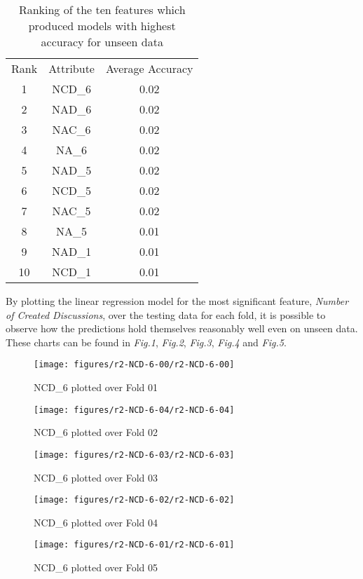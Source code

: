 \documentclass[11pt]{article}
\begin{document}
\begin{table}[h!]
\centering
\normalsize\begin{tabulary}{1.0\textwidth}{CCC}
Rank & Attribute & Average Accuracy \\
1 & NCD\_6 & 0.02 \\
2 & NAD\_6 & 0.02 \\
3 & NAC\_6 & 0.02 \\
4 & NA\_6 & 0.02 \\
5 & NAD\_5 & 0.02 \\
6 & NCD\_5 & 0.02 \\
7 & NAC\_5 & 0.02 \\
8 & NA\_5 & 0.01 \\
9 & NAD\_1 & 0.01 \\
10 & NCD\_1 & 0.01 \\
\end{tabulary}
\caption{{Ranking of the ten features which produced models with highest accuracy
for unseen data
{\label{987099}}%
}}
\end{table}By plotting the linear regression model for the most significant feature, \textit{Number of Created Discussions}, over the testing data for each fold, it is possible to observe how the predictions hold themselves reasonably well even on unseen data. These charts can be found in \textit{Fig.1}, \textit{Fig.2}, \textit{Fig.3}, \textit{Fig.4} and \textit{Fig.5}.
\begin{figure}[h!]
\begin{center}
\texttt{[image: figures/r2-NCD-6-00/r2-NCD-6-00]}
\caption{{NCD\_6 plotted over Fold 01
{\label{793133}}%
}}
\end{center}
\end{figure}
\begin{figure}[h!]
\begin{center}
\texttt{[image: figures/r2-NCD-6-04/r2-NCD-6-04]}
\caption{{NCD\_6 plotted over Fold 02
{\label{898146}}%
}}
\end{center}
\end{figure}
\begin{figure}[h!]
\begin{center}
\texttt{[image: figures/r2-NCD-6-03/r2-NCD-6-03]}
\caption{{NCD\_6 plotted over Fold 03
{\label{346971}}%
}}
\end{center}
\end{figure}
\begin{figure}[h!]
\begin{center}
\texttt{[image: figures/r2-NCD-6-02/r2-NCD-6-02]}
\caption{{NCD\_6 plotted over Fold 04
{\label{478810}}%
}}
\end{center}
\end{figure}
\begin{figure}[h!]
\begin{center}
\texttt{[image: figures/r2-NCD-6-01/r2-NCD-6-01]}
\caption{{NCD\_6 plotted over Fold 05
{\label{673896}}%
}}
\end{center}
\end{figure}
\end{document}
